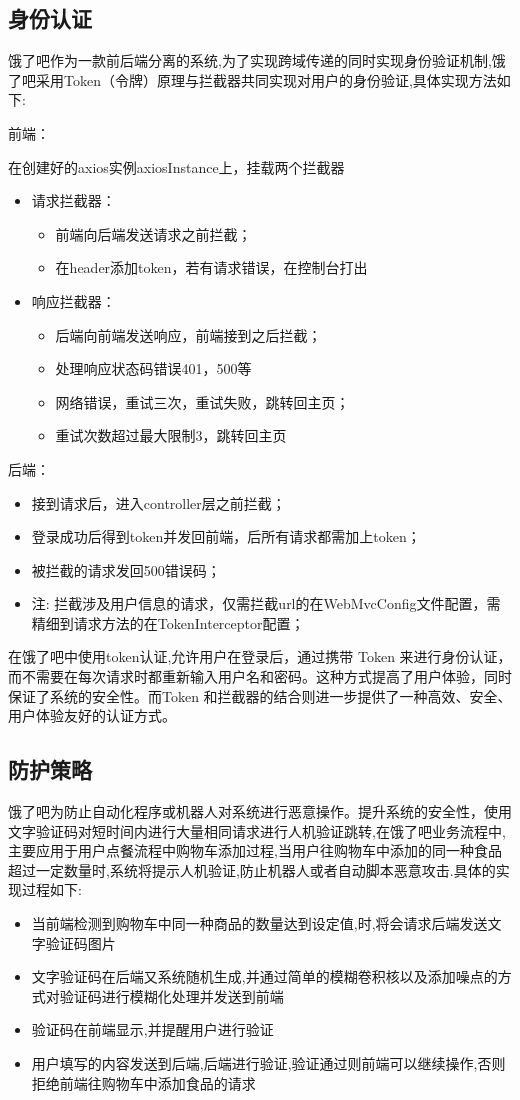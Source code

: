 \subsection{身份认证}
饿了吧作为一款前后端分离的系统,为了实现跨域传递的同时实现身份验证机制,饿了吧采用Token（令牌）原理与拦截器共同实现对用户的身份验证,具体实现方法如下:

前端：

在创建好的axios实例axiosInstance上，挂载两个拦截器
\begin{itemize}
\item 请求拦截器：
\begin{itemize}
    \item 前端向后端发送请求之前拦截；
    \item 在header添加token，若有请求错误，在控制台打出
\end{itemize}
\item 响应拦截器：
\begin{itemize}
    \item 后端向前端发送响应，前端接到之后拦截；
    \item 处理响应状态码错误401，500等
    \item 网络错误，重试三次，重试失败，跳转回主页；
    \item 重试次数超过最大限制3，跳转回主页
\end{itemize}
\end{itemize}
后端：

\begin{itemize}
    \item 接到请求后，进入controller层之前拦截；
    \item 登录成功后得到token并发回前端，后所有请求都需加上token；
    \item 被拦截的请求发回500错误码；
    \footnotesize
    \item 注: 拦截涉及用户信息的请求，仅需拦截url的在WebMvcConfig文件配置，需精细到请求方法的在TokenInterceptor配置；
    \normalsize
\end{itemize}

在饿了吧中使用token认证,允许用户在登录后，通过携带 Token 来进行身份认证，而不需要在每次请求时都重新输入用户名和密码。这种方式提高了用户体验，同时保证了系统的安全性。而Token 和拦截器的结合则进一步提供了一种高效、安全、用户体验友好的认证方式。

\subsection{防护策略}
饿了吧为防止自动化程序或机器人对系统进行恶意操作。提升系统的安全性，使用文字验证码对短时间内进行大量相同请求进行人机验证跳转,在饿了吧业务流程中,主要应用于用户点餐流程中购物车添加过程,当用户往购物车中添加的同一种食品超过一定数量时,系统将提示人机验证,防止机器人或者自动脚本恶意攻击.具体的实现过程如下:

\begin{itemize}
    \item 当前端检测到购物车中同一种商品的数量达到设定值,时,将会请求后端发送文字验证码图片
    \item 文字验证码在后端又系统随机生成,并通过简单的模糊卷积核以及添加噪点的方式对验证码进行模糊化处理并发送到前端
    \item 验证码在前端显示,并提醒用户进行验证
    \item 用户填写的内容发送到后端,后端进行验证,验证通过则前端可以继续操作,否则拒绝前端往购物车中添加食品的请求
\end{itemize}